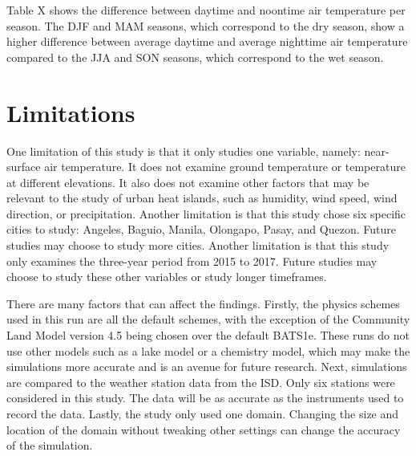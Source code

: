 		Table X shows the difference between daytime and noontime air temperature per season.
		The DJF and MAM seasons, which correspond to the dry season, show a higher difference between average daytime and average nighttime air temperature compared to the JJA and SON seasons, which correspond to the wet season.
		

\section{Limitations}
	One limitation of this study is that it only studies one variable, namely: near-surface air temperature.
	It does not examine ground temperature or temperature at different elevations.
	It also does not examine other factors that may be relevant to the study of urban heat islands, such as humidity, wind speed, wind direction, or precipitation. 
	Another limitation is that this study chose six specific cities to study: Angeles, Baguio, Manila, Olongapo, Pasay, and Quezon.
	Future studies may choose to study more cities.
	Another limitation is that this study only examines the three-year period from 2015 to 2017.
	Future studies may choose to study these other variables or study longer timeframes.
	
	There are many factors that can affect the findings. 
	Firstly, the physics schemes used in this run are all the default schemes, with the exception of the Community Land Model version 4.5 being chosen over the default BATS1e. 
	These runs do not use other models such as a lake model or a chemistry model, which may make the simulations more accurate and is an avenue for future research.
	Next, simulations are compared to the weather station data from the ISD.
	Only six stations were considered in this study.
	The data will be as accurate as the instruments used to record the data.
	Lastly, the study only used one domain.
	Changing the size and location of the domain without tweaking other settings can change the accuracy of the simulation.